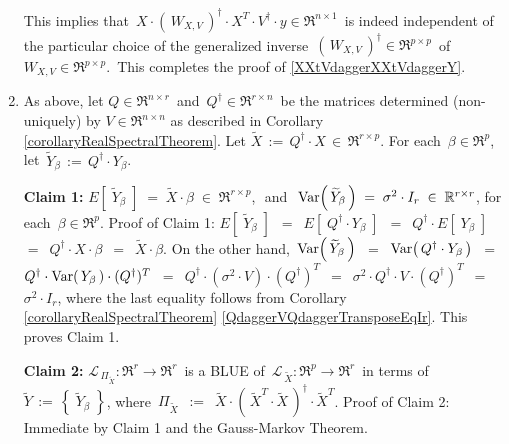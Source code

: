 \begin{enumerate}
	This implies that
	\,$X \cdot \left(\,W_{X,V}\,\right)^{\dagger} \cdot X^{T} \cdot V^{\dagger} \cdot y \in \Re^{n \times 1}$\,
	is indeed independent of the particular choice of the generalized inverse
	\,$\left(\,W_{X,V}\,\right)^{\dagger} \in \Re^{p \times p}$\,
	of \,$W_{X,V} \in \Re^{p \times p}$.\,
	This completes the proof of \eqref{XXtVdaggerXXtVdaggerY}.
\item
	As above, let $Q \in \Re^{n \times r}$\, and \,$Q^{\dagger} \in \Re^{r \times n}$\,
	be the matrices determined (non-uniquely) by $V \in \Re^{n \times n}$
	as described in Corollary \ref{corollaryRealSpectralTheorem}.
	Let $\widetilde{X} \,:=\, Q^{\dagger} \cdot X \,\in\, \Re^{r \times p}$.
	For each \,$\beta \in \Re^{p}$,\, let \,$\widetilde{Y}_{\beta} \,:=\, Q^{\dagger} \cdot Y_{\beta}$.
	
	\vskip 0.5cm
	\noindent
	\textbf{Claim 1:}\quad
	$E\!\left[\;\widetilde{Y}_{\beta}\;\right] \; = \; \widetilde{X} \cdot \beta \; \in \; \Re^{r \times p}$,\,
	\,and\,
	\,$\textnormal{Var}\!\left(\,\widetilde{Y}_{\beta}\,\right) \; = \; \sigma^{2} \cdot I_{r} \; \in \; \mathbb{R}^{r \times r}$,\;
	for each \,$\beta \in \Re^{p}$.
	\vskip 0.0cm
	\noindent
	Proof of Claim 1:\quad
	$E\!\left[\;\widetilde{Y}_{\beta}\;\right]$
	\,$=$\, $E\!\left[\;Q^{\dagger} \cdot Y_{\beta}\;\right]$
	\,$=$\, $Q^{\dagger} \cdot E\!\left[\;Y_{\beta}\;\right]$
	\,$=$\, $Q^{\dagger} \cdot X \cdot \beta$
	\,$=$\, $\widetilde{X} \cdot \beta$.
	On the other hand,
	\,$\textnormal{Var}\!\left(\,\widetilde{Y}_{\beta}\,\right)$
	\,$=$\, $\textnormal{Var}\!\left(\,Q^{\dagger} \cdot Y_{\beta}\,\right)$
	\,$=$\, $Q^{\dagger} \cdot \textnormal{Var}\!\left(\,Y_{\beta}\,\right) \cdot (Q^{\dagger})^{T}$
	\,$=$\, $Q^{\dagger} \cdot (\sigma^{2} \cdot V) \cdot (Q^{\dagger})^{T}$
	\,$=$\, $\sigma^{2} \cdot Q^{\dagger} \cdot V \cdot (Q^{\dagger})^{T}$
	\,$=$\, $\sigma^{2} \cdot I_{r}$,
	where the last equality follows from
	Corollary \ref{corollaryRealSpectralTheorem} \eqref{QdaggerVQdaggerTransposeEqIr}.
	This proves Claim 1.

	\vskip 0.5cm
	\noindent
	\textbf{Claim 2:}\quad
	$\mathcal{L}_{\,\Pi_{\widetilde{X}}} : \Re^{r} \longrightarrow \Re^{r}$\,
	is a BLUE of 
	\,$\mathcal{L}_{\,\widetilde{X}} : \Re^{p} \longrightarrow \Re^{r}$\,
	in terms of
	\,$\widetilde{Y} \,:=\, \left\{\;\widetilde{Y}_{\beta}\;\right\}$,
	where
	\,$\Pi_{\widetilde{X}}$
	\,$:=$\, $\widetilde{X} \cdot (\,\widetilde{X}^{T} \cdot \widetilde{X}\,)^{\dagger} \cdot \widetilde{X}^{T}$.
	\vskip 0.0cm
	\noindent
	Proof of Claim 2:\quad
	Immediate by Claim 1 and the Gauss-Markov Theorem.


\end{enumerate}
